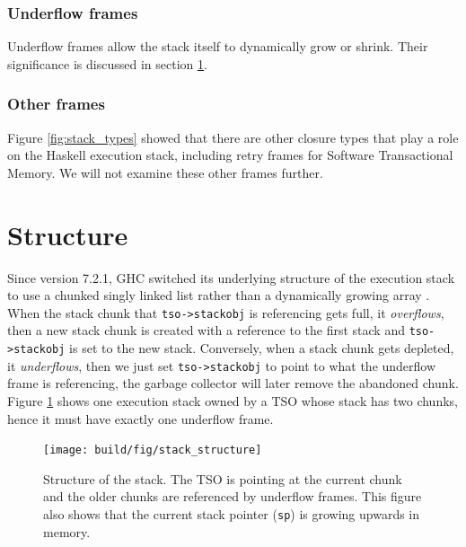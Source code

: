 \subsubsection{Underflow frames}

Underflow frames allow the stack itself to dynamically grow or
shrink. Their significance is discussed in section \ref{sec:structure_of_stack}.

\subsubsection{Other frames}

Figure \ref{fig:stack_types} showed that there are other closure types
that play a role on the Haskell execution stack, including retry frames
for Software Transactional Memory. We will not examine these other
frames further.

\section{Structure} \label{sec:structure_of_stack}

Since version 7.2.1, GHC switched its underlying structure of the
execution stack to use a chunked singly linked list rather than a
dynamically growing array \cite{ghc_blog_overhaul_of_stack_management}
\cite{ghc_changeset_stack_chunks}. When the stack chunk that
\texttt{tso->stackobj} is referencing gets full, it \emph{overflows},
then a new stack chunk is created with a reference to the first stack
and \texttt{tso->stackobj} is set to the new stack. Conversely, when
a stack chunk gets depleted, it \emph{underflows}, then we just
set \texttt{tso->stackobj} to point to what the underflow frame is
referencing, the garbage collector will later remove the abandoned
chunk. Figure \ref{fig:stack_structure} shows one execution stack
owned by a TSO whose stack has two chunks, hence it must have exactly
one underflow frame.

\begin{figure}
\begin{mdframed}
  \texttt{[image: build/fig/stack\_structure]}
  \caption{Structure of the stack. The TSO is pointing at the current
  chunk and the older chunks are referenced by underflow frames. This
  figure also shows that the current stack pointer (\texttt{sp}) is
  growing upwards in memory.}
  \label{fig:stack_structure}
\end{mdframed}
\end{figure}

